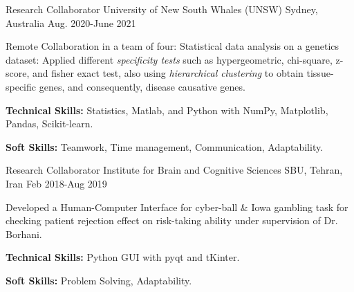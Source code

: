 \begin{cventries}
  \cventry
{Research Collaborator}  %
    {University of New South Whales (UNSW)} %
    {Sydney, Australia} %
    {Aug. 2020-June 2021} %
    {
      \begin{cvitems} %
        \item{Remote Collaboration in a team of four: Statistical data analysis on a genetics dataset: Applied different \textit{specificity tests} such as hypergeometric, chi-square, z-score, and fisher exact test, also using \textit{hierarchical clustering} to obtain tissue-specific genes, and consequently, disease causative genes.}
        \item {\textbf{Technical Skills:} Statistics, Matlab, and Python with NumPy, Matplotlib, Pandas, Scikit-learn.}
        \item {\textbf{Soft Skills:} Teamwork, Time management, Communication, Adaptability.}
      \end{cvitems}
    }
 
  \cventry
    {Research Collaborator}  %
    {Institute for Brain and Cognitive Sciences} %
    {SBU, Tehran, Iran} %
    {Feb 2018-Aug 2019} %
    {
      \begin{cvitems} %
        \item{Developed a Human-Computer Interface for cyber-ball \& Iowa gambling task for checking patient rejection effect on risk-taking ability under supervision of Dr. Borhani.}
        \item {\textbf{Technical Skills:} Python GUI with pyqt and tKinter.}
        \item {\textbf{Soft Skills:} Problem Solving, Adaptability.}
      \end{cvitems}
    }
 

\end{cventries}
